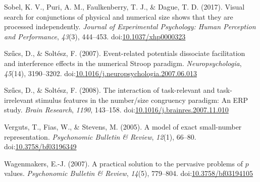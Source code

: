 \documentclass[english,,man]{apa6}
\theoremstyle{definition}
\theoremstyle{definition}
\theoremstyle{definition}
\theoremstyle{remark}
\begin{document}
\leavevmode\hypertarget{ref-sobel2017}{}%
Sobel, K. V., Puri, A. M., Faulkenberry, T. J., \& Dague, T. D. (2017).
Visual search for conjunctions of physical and numerical size shows that
they are processed independently. \emph{Journal of Experimental
Psychology: Human Perception and Performance}, \emph{43}(3), 444--453.
doi:\href{https://doi.org/10.1037/xhp0000323}{10.1037/xhp0000323}

\leavevmode\hypertarget{ref-szucs2007}{}%
Szűcs, D., \& Soltész, F. (2007). Event-related potentials dissociate
facilitation and interference effects in the numerical Stroop paradigm.
\emph{Neuropsychologia}, \emph{45}(14), 3190--3202.
doi:\href{https://doi.org/10.1016/j.neuropsychologia.2007.06.013}{10.1016/j.neuropsychologia.2007.06.013}

\leavevmode\hypertarget{ref-szucs2008}{}%
Szűcs, D., \& Soltész, F. (2008). The interaction of task-relevant and
task-irrelevant stimulus features in the number/size congruency
paradigm: An ERP study. \emph{Brain Research}, \emph{1190}, 143--158.
doi:\href{https://doi.org/10.1016/j.brainres.2007.11.010}{10.1016/j.brainres.2007.11.010}

\leavevmode\hypertarget{ref-verguts2005}{}%
Verguts, T., Fias, W., \& Stevens, M. (2005). A model of exact
small-number representation. \emph{Psychonomic Bulletin \& Review},
\emph{12}(1), 66--80.
doi:\href{https://doi.org/10.3758/bf03196349}{10.3758/bf03196349}

\leavevmode\hypertarget{ref-wagenmakers2007}{}%
Wagenmakers, E.-J. (2007). A practical solution to the pervasive
problems of \(p\) values. \emph{Psychonomic Bulletin \& Review},
\emph{14}(5), 779--804.
doi:\href{https://doi.org/10.3758/bf03194105}{10.3758/bf03194105}
\end{document}
